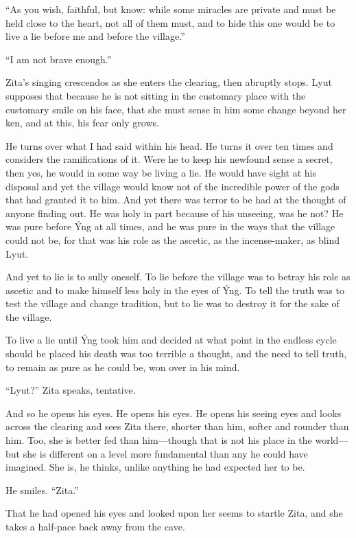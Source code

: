 ``As you wish, faithful, but know: while some miracles are private and must be held close to the heart, not all of them must, and to hide this one would be to live a lie before me and before the village.''

``I am not brave enough.''

Zita's singing crescendos as she enters the clearing, then abruptly stops. Lyut supposes that because he is not sitting in the customary place with the customary smile on his face, that she must sense in him some change beyond her ken, and at this, his fear only grows.

He turns over what I had said within his head. He turns it over ten times and considers the ramifications of it. Were he to keep his newfound sense a secret, then yes, he would in some way be living a lie. He would have sight at his disposal and yet the village would know not of the incredible power of the gods that had granted it to him. And yet there was terror to be had at the thought of anyone finding out. He was holy in part because of his unseeing, was he not? He was pure before Ýng at all times, and he was pure in the ways that the village could not be, for that was his role as the ascetic, as the incense-maker, as blind Lyut.

And yet to lie is to sully oneself. To lie before the village was to betray his role as ascetic and to make himself less holy in the eyes of Ýng. To tell the truth was to test the village and change tradition, but to lie was to destroy it for the sake of the village.

To live a lie until Ýng took him and decided at what point in the endless cycle should be placed his death was too terrible a thought, and the need to tell truth, to remain as pure as he could be, won over in his mind.

``Lyut?'' Zita speaks, tentative.

And so he opens his eyes. He opens his eyes. He opens his seeing eyes and looks across the clearing and sees Zita there, shorter than him, softer and rounder than him. Too, she is better fed than him---though that is not his place in the world---but she is different on a level more fundamental than any he could have imagined. She is, he thinks, unlike anything he had expected her to be.

He smiles. ``Zita.''

That he had opened his eyes and looked upon her seems to startle Zita, and she takes a half-pace back away from the cave.

